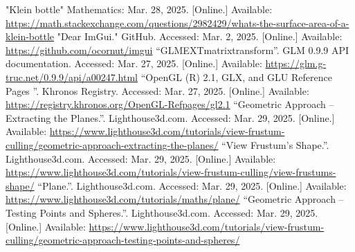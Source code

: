 \documentclass[12pt, a4paper]{article}
\begin{document}
\begin{thebibliography}{9}
        "Klein bottle"{} Mathematics: Mar. 28, 2025. [Online.] Available:
     \url{https://math.stackexchange.com/questions/2982429/whats-the-surface-area-of-a-klein-bottle}
        "Dear ImGui."{} GitHub. Accessed: Mar. 2, 2025. [Online.] Available:
        \url{https://github.com/ocornut/imgui}
        ``GLM\textunderscore EXT\textunderscore matrix\textunderscore transform''. GLM 0.9.9 API
        documentation. Accessed: Mar. 27, 2025. [Online.] Available:
        \url{https://glm.g-truc.net/0.9.9/api/a00247.html}
        ``OpenGL (R) 2.1, GLX, and GLU Reference Pages ''. Khronos Registry.
        Accessed: Mar. 27, 2025. [Online.] Available:
        \url{https://registry.khronos.org/OpenGL-Refpages/gl2.1}
        ``Geometric Approach -- Extracting the Planes.''. Lighthouse3d.com. Accessed:
        Mar. 29, 2025. [Online.] Available:
        \url{https://www.lighthouse3d.com/tutorials/view-frustum-culling/geometric-approach-extracting-the-planes/}
        ``View Frustum’s Shape.''. Lighthouse3d.com. Accessed:
        Mar. 29, 2025. [Online.] Available:
        \url{https://www.lighthouse3d.com/tutorials/view-frustum-culling/view-frustums-shape/}
        ``Plane.''. Lighthouse3d.com. Accessed:
        Mar. 29, 2025. [Online.] Available:
        \url{https://www.lighthouse3d.com/tutorials/maths/plane/}
        ``Geometric Approach -- Testing Points and Spheres.''. Lighthouse3d.com. Accessed:
        Mar. 29, 2025. [Online.] Available:
        \url{https://www.lighthouse3d.com/tutorials/view-frustum-culling/geometric-approach-testing-points-and-spheres/}
\end{thebibliography}
\endgroup
\end{document}
